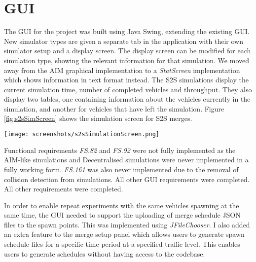 \section{GUI}
\label{sec:GUI}
The GUI for the project was built using Java Swing, extending the existing GUI. New simulator types are given a separate tab in the application with their own simulator setup and a display screen. The display screen can be modified for each simulation type, showing the relevant information for that simulation. We moved away from the AIM graphical implementation to a \emph{StatScreen} implementation which shows information in text format instead. The S2S simulations display the current simulation time, number of completed vehicles and throughput. They also display two tables, one containing information about the vehicles currently in the simulation, and another for vehicles that have left the simulation. Figure \ref{fig:s2sSimScreen} shows the simulation screen for S2S merges.

\begin{sidewaysfigure}[p]
\texttt{[image: screenshots/s2sSimulationScreen.png]}
\caption{The simulation screen for the S2S merge screen}
\label{fig:s2sSimScreen}
\end{sidewaysfigure}

Functional requirements \emph{FS.82} and \emph{FS.92} were not fully implemented as the AIM-like simulations and Decentralised simulations were never implemented in a fully working form. \emph{FS.161} was also never implemented due to the removal of collision detection from simulations. All other GUI requirements were completed. All other requirements were completed.

In order to enable repeat experiments with the same vehicles spawning at the same time, the GUI needed to support the uploading of merge schedule JSON files to the spawn points. This was implemented using \emph{JFileChooser}. I also added an extra feature to the merge setup panel which allows users to generate spawn schedule files for a specific time period at a specified traffic level. This enables users to generate schedules without having access to the codebase.

